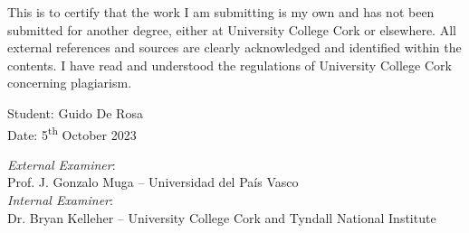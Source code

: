 This is to certify that the work I am submitting is my own and has not been
submitted for another degree, either at University College Cork or elsewhere. All
external references and sources are clearly acknowledged and identified within the
contents. I have read and understood the regulations of University College Cork
concerning plagiarism.

\hfill

\noindent Student: Guido De Rosa \\
\noindent Date: 5\textsuperscript{th} October 2023

\hfill

\hfill

\noindent \emph{External Examiner}:\\Prof. J. Gonzalo Muga -- Universidad del Pa\'{i}s Vasco\\
\noindent \emph{Internal Examiner}:\\Dr. Bryan Kelleher -- University College Cork and Tyndall National Institute
